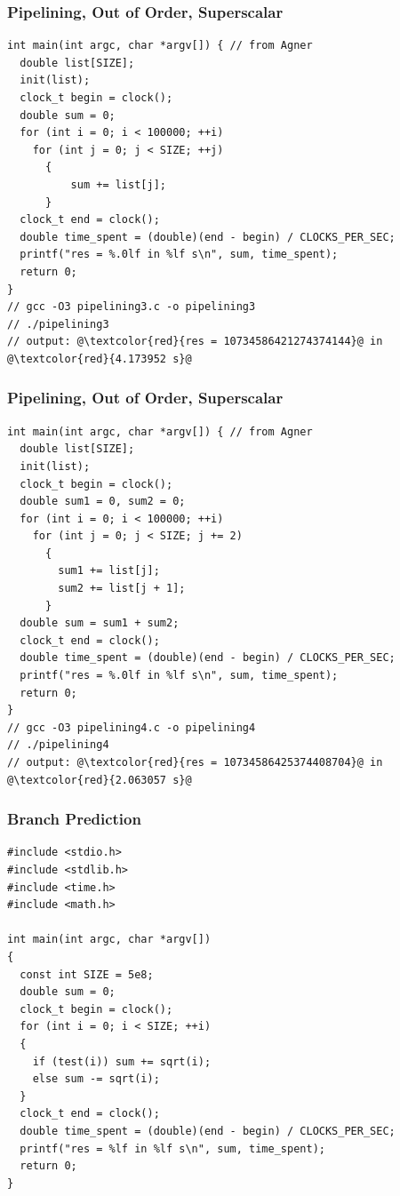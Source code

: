 \documentclass{beamer}
\begin{document}
\begin{frame}[fragile]
\frametitle{Pipelining, Out of Order, Superscalar}
\scriptsize
\begin{lstlisting}[linebackgroundcolor={\lstcolorlines{7,8,9,10}}]
int main(int argc, char *argv[]) { // from Agner
  double list[SIZE];
  init(list);
  clock_t begin = clock();
  double sum = 0;
  for (int i = 0; i < 100000; ++i)
    for (int j = 0; j < SIZE; ++j)
      {
          sum += list[j];
      }
  clock_t end = clock();
  double time_spent = (double)(end - begin) / CLOCKS_PER_SEC;
  printf("res = %.0lf in %lf s\n", sum, time_spent);
  return 0;
}
// gcc -O3 pipelining3.c -o pipelining3
// ./pipelining3
// output: @\textcolor{red}{res = 10734586421274374144}@ in @\textcolor{red}{4.173952 s}@
\end{lstlisting}

\end{frame}

\begin{frame}[fragile]
\frametitle{Pipelining, Out of Order, Superscalar}
\scriptsize
\begin{lstlisting}[linebackgroundcolor={\lstcolorlines{7,8,9,10,11,12}}]
int main(int argc, char *argv[]) { // from Agner
  double list[SIZE];
  init(list);
  clock_t begin = clock();
  double sum1 = 0, sum2 = 0;
  for (int i = 0; i < 100000; ++i)
    for (int j = 0; j < SIZE; j += 2)
      {
        sum1 += list[j];
        sum2 += list[j + 1];
      }
  double sum = sum1 + sum2;
  clock_t end = clock();
  double time_spent = (double)(end - begin) / CLOCKS_PER_SEC;
  printf("res = %.0lf in %lf s\n", sum, time_spent);
  return 0;
}
// gcc -O3 pipelining4.c -o pipelining4
// ./pipelining4
// output: @\textcolor{red}{res = 10734586425374408704}@ in @\textcolor{red}{2.063057 s}@
\end{lstlisting}

\end{frame}

\begin{frame}[fragile]
\frametitle{Branch Prediction}
\scriptsize
\begin{lstlisting}[linebackgroundcolor={\lstcolorlines{13,14}}]
#include <stdio.h>
#include <stdlib.h>
#include <time.h>
#include <math.h>

int main(int argc, char *argv[])
{
  const int SIZE = 5e8;
  double sum = 0;
  clock_t begin = clock();
  for (int i = 0; i < SIZE; ++i)
  {
    if (test(i)) sum += sqrt(i);
    else sum -= sqrt(i);
  }
  clock_t end = clock();
  double time_spent = (double)(end - begin) / CLOCKS_PER_SEC;
  printf("res = %lf in %lf s\n", sum, time_spent);
  return 0;
}
\end{lstlisting}

\end{frame}
\end{document}

